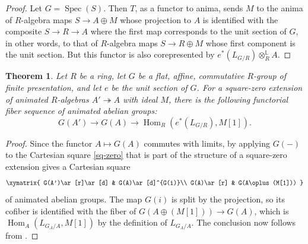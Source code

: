 \documentclass[11pt, reqno]{amsart}
\DeclareMathOperator{\Hom}{Hom}		%
\DeclareMathOperator{\Spec}{Spec}		%
\newcommand{\surjects}{\twoheadrightarrow}
\providecommand{\uc}{{\upshape:} }
\newcommand{\be}{\begin{equation}}
\newcommand{\ee}{\end{equation}}
\newcommand{\bthm}{\begin{thm}}
\newcommand{\ethm}{\end{thm}}
\numberwithin{equation}{numberingbase}
\theoremstyle{thms}
\newtheorem{thm}[numberingbase]{Theorem}
\theoremstyle{claims}
\theoremstyle{defs}
\theoremstyle{thms}
\theoremstyle{defs}
\theoremstyle{subsection-tweak}
\theoremstyle{subsection-tweak}
\begin{document}
\begin{proof} Let $G=\Spec(S)$. Then $T$, as a functor to anima, sends $M$ to the anima of $R$-algebra maps $S\to A\oplus M$ whose projection to $A$ is identified with the composite $S\to R\to A$ where the first map corresponds to the unit section of $G$, in other words, to that of $R$-algebra maps $S\to R\oplus M$ whose first component is the unit section. But this functor is also corepresented by $e^\ast(L_{G/R})\otimes_R^{\mathbb L} A$.
\end{proof}









\bthm\label{cor:deftheorygroup}
Let $R$ be a ring, let $G$ be a flat, affine, commutative $R$-group of finite presentation, and let $e$ be the unit section of $G$. For a square-zero extension of animated $R$-algebras $A'\surjects A$ with ideal $M$,
 there is the following functorial fiber sequence of animated abelian groups\uc
\be \label{eqn:def-thy-basic}
G(A')\to G(A)\to \Hom_R(e^*(L_{G/R}), M[1]).
\ee
\ethm

\begin{proof} %
Since the functor $A\mapsto G(A)$ commutes with limits, by applying $G(-)$ to the Cartesian square \eqref{sq-zero} that is part of the structure of a square-zero extension gives a Cartesian square
\[
\xymatrix{
G(A')\ar[r]\ar[d] & G(A)\ar[d]^{G(i)}\\
G(A)\ar[r] & G(A\oplus (M[1]))
}\]
of animated abelian groups. The map $G(i)$ is split by the projection, so its cofiber is identified with the fiber of $G(A\oplus (M[1]))\to G(A)$, which is $\Hom_A(L_{G_A/A},M[1])$ by the definition of $L_{G_A/A}$. The conclusion now follows from . %
\end{proof}
\end{document}
